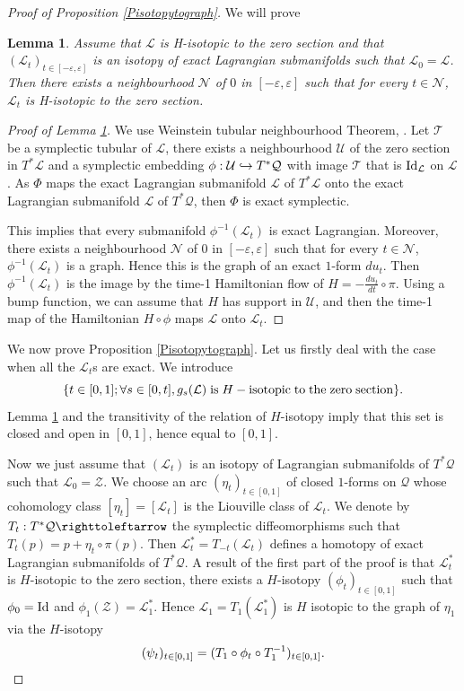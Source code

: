 \documentclass[10pt]{amsart}
\def\hto{\mathrel{\lhook\joinrel\to}}
\newtheorem{lemma}{Lemma}
\theoremstyle{definition}
\def\cL{{\mathcal L}}
\def\cN{{\mathcal N}}
\def\cQ{{\mathcal Q}}
\def\cT{{\mathcal T}}
\def\cU{{\mathcal U}}
\def\cZ{{\mathcal Z}}
\begin{document}
\begin{proof}[Proof of Proposition \ref{Pisotopytograph}]
We will prove
\begin{lemma}\label{Lisotexactlagr}
Assume that $\cL$ is H-isotopic to the zero section and that $(\cL_t)_{t\in[-\varepsilon, \varepsilon]}$ is an isotopy of exact Lagrangian submanifolds such that $\cL_0=\cL$. Then there exists a neighbourhood $\cN$ of $0$ in $[-\varepsilon, \varepsilon]$ such that for every $t\in\cN$, $\cL_t$ is H-isotopic to the zero section.
\end{lemma}

\begin{proof}[Proof of Lemma \ref{Lisotexactlagr}]
We use Weinstein tubular neighbourhood Theorem, \cite{Weinstein1977}. Let $\cT$ be a symplectic tubular of $\cL$, \ie there exists a neighbourhood $\cU$ of the zero section in $T^*\cL$ and a symplectic embedding $\phi:\cU \hto T^*\cQ$ with image $\cT$ that is ${\rm Id}_{\cL}$ on $\cL$. As $\Phi$ maps the exact Lagrangian submanifold $\cL$ of $T^*\cL$ onto the exact Lagrangian submanifold $\cL$ of $T^*\cQ$, then $\Phi$ is exact symplectic.

This implies that every submanifold $\phi^{-1}(\cL_t)$ is exact Lagrangian. Moreover, there exists a neighbourhood $\cN$ of $0$ in $[-\varepsilon, \varepsilon]$ such that for every $t\in\cN$, $\phi^{-1}(\cL_t)$ is a graph. Hence this is the graph of an exact $1$-form $du_t$. Then $\phi^{-1}(\cL_t)$ is the image by the time-1 Hamiltonian flow of $H=-\frac{du_t}{dt}\circ \pi$. Using a bump function, we can assume that $H$ has support in $\cU$, and then the time-1 map of the Hamiltonian $H\circ\phi$ maps $\cL$ onto $\cL_t$.
\end{proof}

We now prove Proposition \ref{Pisotopytograph}. Let us firstly deal with the case when all the $\cL_t$s are exact. We introduce
\[
\{ t\in[0, 1]; \forall s\in [0, t], g_s(\cL)\;{\rm is}\; H-{\rm isotopic}\;{\rm to}\;{\rm the}\;{\rm zero}\;{\rm section}\}.
\]
Lemma \ref{Lisotexactlagr} and the transitivity of the relation of $H$-isotopy imply that this set is closed and open in $[0, 1]$, hence equal to $[0,1]$.

Now we just assume that $(\cL_t)$ is an isotopy of Lagrangian submanifolds of $T^*\cQ$ such that $\cL_0=\cZ$. We choose an arc $(\eta_t)_{t\in[0,1]}$ of closed $1$-forms on $\cQ$ whose cohomology class $[\eta_t]=[\cL_t]$ is the Liouville class of $\cL_t$. We denote by $T_t:T^*\cQ\righttoleftarrow$ the symplectic diffeomorphisms such that $T_t(p)=p+\eta_t\circ\pi (p)$. Then $\cL^*_t=T_{-t}(\cL_t)$ defines a homotopy of exact Lagrangian submanifolds of $T^*\cQ$. A result of the first part of the proof is that $\cL^*_t$ is $H$-isotopic to the zero section, \ie there exists a $H$-isotopy $(\phi_t)_{t\in[0, 1]}$ such that $\phi_0={\rm Id}$ and $\phi_1(\cZ)=\cL^*_1$. Hence $\cL_1=T_1(\cL^*_1)$ is $H$ isotopic to the graph of $\eta_1$ via the $H$-isotopy
\[
(\psi_t)_{t\in[0,1]}=(T_1\circ \phi_t\circ T_1^{-1})_{t\in[0, 1]}.\qedhere
\]
\end{proof}
\end{document}
